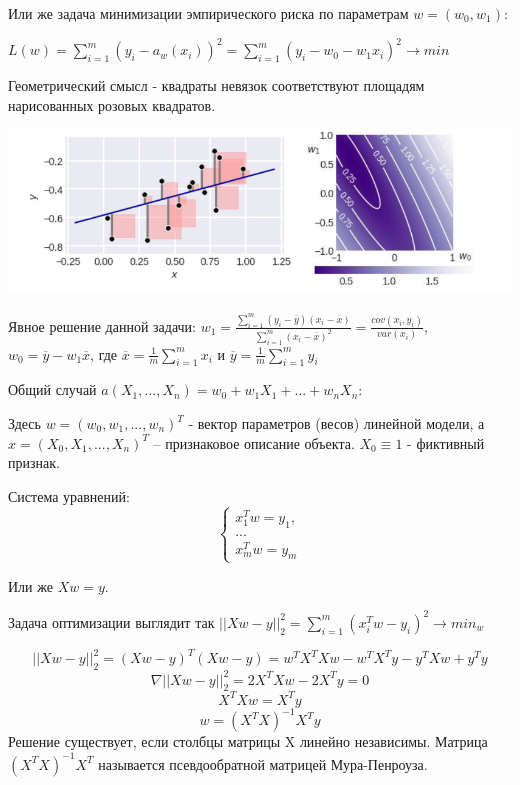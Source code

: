 Или же задача минимизации эмпирического риска по параметрам $w=(w_0, w_1)$:

$L(w) = \sum\limits_{i=1}^m (y_i - a_w(x_i))^2 = \sum\limits_{i=1}^m (y_i - w_0 - w_1x_i)^2 \rightarrow min$

Геометрический смысл - квадраты невязок соответствуют площадям нарисованных розовых
квадратов.

\includegraphics[scale=0.4]{pics/ml2_lin2.png}

Явное решение данной задачи:
$w_1 = \frac{\sum\limits_{i=1}^m (y_i - \overline y)(x_i - \overline x)}{\sum\limits_{i=1}^m (x_i - \overline x)^2} = \frac{cov(x_i, y_i)}{var(x_i)}$, $w_0 = \overline y - w_1 \overline x$, где $\overline x = \frac{1}{m} \sum\limits_{i=1}^m x_i$ и $\overline y = \frac{1}{m} \sum\limits_{i=1}^m y_i$

Общий случай $a(X_1, ..., X_n) = w_0 + w_1X_1 + ... + w_nX_n$:

Здесь $w = (w_0, w_1, ..., w_n)^T$ - вектор параметров (весов) линейной модели, а $x = (X_0, X_1, ..., X_n)^T$ – признаковое описание объекта. $X_0 \equiv 1$ - фиктивный признак.

Система уравнений:
\begin{equation*}
 \begin{cases}
   x_1^Tw = y_1, 
   \\
   ...
   \\
   x_m^Tw = y_m
 \end{cases}
\end{equation*}

Или же $Xw = y$.

Задача оптимизации выглядит так $|| Xw - y ||_2^2 = \sum\limits_{i=1}^m (x_i^Tw - y_i)^2 \rightarrow min_w$

\begin{equation}
|| Xw - y ||_2^2 = (Xw - y)^T(Xw - y)= w^TX^TXw - w^TX^Ty - y^TXw +y^Ty
\end{equation}
\begin{equation}
\nabla || Xw - y ||_2^2 = 2X^TXw - 2X^Ty = 0
\end{equation}
\begin{equation}
 X^TXw = X^Ty
\end{equation}
\begin{equation}
 w = (X^TX)^{-1}X^Ty
\end{equation}
Решение существует, если столбцы матрицы X линейно независимы.
Матрица $(X^TX)^{-1}X^T$ называется псевдообратной матрицей Мура-Пенроуза.

